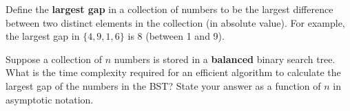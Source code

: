 \begin{prob}
    Define the \textbf{largest gap} in a collection of numbers to be the largest difference
    between two distinct elements in the collection (in absolute value).
    For example, the largest gap in $\{4, 9, 1, 6\}$ is 8 (between 1 and 9).

    Suppose a collection of $n$ numbers is stored in a \textbf{balanced} binary search
    tree.
    What is the time complexity required for an efficient algorithm to calculate
    the largest gap of the numbers in the BST? State your answer as a function of $n$ in
    asymptotic notation.


\end{prob}
